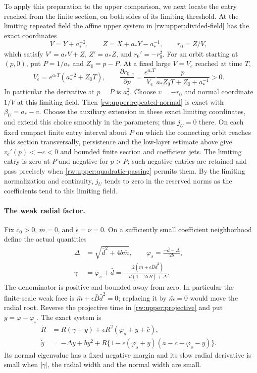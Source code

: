 To apply this preparation to the upper comparison, we next locate the
entry reached from the finite section, on both sides of its limiting
threshold.  At the limiting repeated field the affine upper
system in \eqref{rw:upper:divided-field} has the exact coordinates
\[
 V=Y+a_*^{-2},\qquad Z=X+a_*Y-a_*^{-1},\qquad r_0=Z/V,
\]
which satisfy $V'=a_*V+Z$, $Z'=a_*Z$, and $r_0'=-r_0^2$.
For an orbit starting at $(p,0)$, put $P=1/a_*$ and $Z_0=p-P$.
At a fixed large $V=V_e$ reached at time $T$,
\[
 V_e=e^{a_*T}(a_*^{-2}+Z_0T),\qquad
 \frac{\partial r_{0,e}}{\partial p}
 =\frac{e^{a_*T}}{V_e}
    \frac{p}{a_*Z_0T+Z_0+a_*^{-1}}>0.
\]
In particular the derivative at $p=P$ is $a_*^2$.
Choose $v=-r_0$ and normal coordinate $1/V$ at this limiting field.
Then \eqref{rw:upper:repeated-normal} is exact with
$\beta_U=a_*-v$. Choose the auxiliary extension in these exact
limiting coordinates, and extend this choice smoothly in the parameters;
thus $j_U=0$ there. On each fixed compact finite entry
interval about $P$ on which the connecting orbit reaches this section
transversally, persistence and the low-layer estimate above give
$v_e'(p)<-c<0$ and bounded finite section and coefficient jets.
The limiting entry is zero at $P$ and negative for $p>P$; such negative
entries are retained and pass precisely when
\eqref{rw:upper:quadratic-passing} permits them. By the limiting
normalization and continuity, $j_U$ tends to zero in the reserved norms
as the coefficients tend to this limiting field.

\paragraph{The weak radial factor.}
Fix $\bar c_0>0$, $\bar m=0$, and $\epsilon=\nu=0$.
On a sufficiently small coefficient neighborhood define the actual
quantities
\begin{equation}\label{rw:upper:weak-parameters}
\begin{split}
 \Delta&=\sqrt{\bar d^2+4b\bar m},\qquad
 \varphi_s=\frac{-\bar d-\Delta}{2b},\\
 \gamma&=\varphi_s+\bar d
 =-\frac{2(\bar m+\epsilon\bar B\bar d^2)}
              {\bar d(1-2\epsilon\bar B)+\Delta}.
\end{split}
\end{equation}
The denominator is positive and bounded away from zero. In particular
the finite-scale weak face is
$\bar m+\epsilon\bar B\bar d^2=0$; replacing it by $\bar m=0$
would move the radial root. Reverse the projective time in
\eqref{rw:upper:projective} and put $y=\varphi-\varphi_s$.
The exact system is
\begin{equation}\label{rw:upper:weak-original}
\begin{split}
 \dot R&=R(\gamma+y)+\epsilon R^2(\varphi_s+y+\bar c),\\
 \dot y&=-\Delta y+by^2
 +R\{1-\epsilon(\varphi_s+y)(\bar a-\bar c-\varphi_s-y)\}.
\end{split}
\end{equation}
Its normal eigenvalue has a fixed negative margin and its slow
radial derivative is small when $|\gamma|$, the radial width and the
normal width are small.

